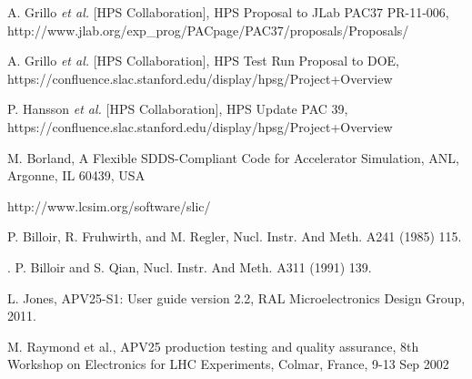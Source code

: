 \begin{thebibliography}{99}


 A. Grillo {\it et al.} [HPS Collaboration], HPS Proposal to JLab PAC37 PR-11-006,
 http://www.jlab.org/exp\_prog/PACpage/PAC37/proposals/Proposals/

 A. Grillo {\it et al.} [HPS Collaboration], HPS Test Run Proposal to DOE, 
https://confluence.slac.stanford.edu/display/hpsg/Project+Overview

 P. Hansson {\it et al.} [HPS Collaboration], HPS Update PAC 39, 
https://confluence.slac.stanford.edu/display/hpsg/Project+Overview



 
 M. Borland, A Flexible SDDS-Compliant Code for Accelerator Simulation, ANL, Argonne, IL 60439, USA
 
  http://www.lcsim.org/software/slic/
 
 P. Billoir, R. Fruhwirth, and M. Regler, Nucl. Instr. And Meth. A241 (1985) 115. 

  . P. Billoir and S. Qian, Nucl. Instr. And Meth. A311 (1991) 139. 

 L. Jones, APV25-S1: User guide version 2.2, RAL Microelectronics Design Group, 2011.

 M. Raymond et al., APV25 production testing and quality assurance, 8th Workshop on Electronics for LHC
	              Experiments, Colmar, France, 9-13 Sep 2002
	               
\end{thebibliography} 